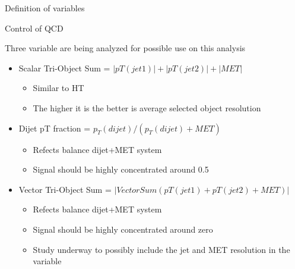 \documentclass[8pt]{beamer}
\begin{document}
\begin{frame}{Definition of variables}
 
\begin{block}{Control of QCD}
  
  Three variable are being analyzed for possible use on this analysis
  \begin{itemize}
   \item Scalar Tri-Object Sum = $|pT(jet1)|+|pT(jet2)|+|MET|$
   \begin{itemize}
     \item Similar to HT
     \item The higher it is the better is average selected object resolution
   \end{itemize}
   \item Dijet pT fraction = $p_{T}(dijet)/(p_{T}(dijet)+MET)$
   \begin{itemize}
     \item Refects balance dijet+MET system
     \item Signal should be highly concentrated around 0.5
   \end{itemize}
   \item Vector Tri-Object Sum = $|Vector Sum(pT(jet1)+pT(jet2)+MET)|$ 
   \begin{itemize}
     \item Refects balance dijet+MET system
     \item Signal should be highly concentrated around zero
     \item Study underway to possibly include the jet and MET resolution in the variable 
   \end{itemize}
  \end{itemize} 
  
\end{block}

\end{frame}
\end{document}
